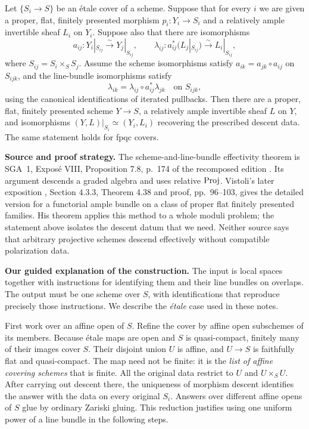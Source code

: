 \begin{Th}
\label{desc:polarized-theorem}
Let $\{S_i\to S\}$ be an \textup{\'etale} cover of a scheme.
Suppose that for every $i$ we are given a proper, flat, finitely
presented morphism $p_i:Y_i\to S_i$ and a relatively ample invertible
sheaf $L_i$ on $Y_i$. Suppose also that there are isomorphisms
\[
 a_{ij}:Y_i|_{S_{ij}}\xrightarrow{\sim}Y_j|_{S_{ij}},
 \qquad
 \lambda_{ij}:a_{ij}^*(L_j|_{S_{ij}})
                   \xrightarrow{\sim}L_i|_{S_{ij}},
\]
where $S_{ij}=S_i\times_S S_j$. Assume the scheme isomorphisms satisfy
$a_{ik}=a_{jk}\circ a_{ij}$ on $S_{ijk}$, and the line-bundle
isomorphisms satisfy
\begin{equation}\label{desc:bundle-cocycle}
 \lambda_{ik}=\lambda_{ij}\circ a_{ij}^*\lambda_{jk}
 \quad\text{on }S_{ijk},
\end{equation}
using the canonical identifications of iterated pullbacks.
Then there are a proper, flat, finitely presented scheme $Y\to S$, a
relatively ample invertible sheaf $L$ on $Y$, and isomorphisms
$(Y,L)|_{S_i}\simeq(Y_i,L_i)$ recovering the prescribed descent data.
The same statement holds for fpqc covers.
\end{Th}

\noindent\textbf{Source and proof strategy.}
The scheme-and-line-bundle effectivity theorem is SGA~1,
Expos\'e VIII, Proposition 7.8, p.~174 of the recomposed edition
\cite{SGA1}. Its argument descends a graded algebra and uses
relative $\operatorname{Proj}$. Vistoli's later exposition \cite{Vistoli},
Section 4.3.3, Theorem 4.38 and proof, pp.~96--103, gives the detailed
version for a functorial ample bundle on a class of proper flat
finitely presented families. His theorem applies this method to a
whole moduli problem; the statement above isolates the descent datum
that we need. Neither source says that arbitrary projective schemes
descend effectively without compatible polarization data.

\noindent\textbf{Our guided explanation of the construction.}
The input is local spaces together with instructions for identifying
them and their line bundles on overlaps. The output must be one
scheme over $S$, with identifications that reproduce precisely those
instructions. We describe the \emph{\'etale} case used in these notes.

First work over an affine open of $S$. Refine the cover by affine open
subschemes of its members. Because \'etale maps are open and $S$ is
quasi-compact, finitely many of their images cover $S$. Their disjoint
union $U$ is affine, and $U\to S$ is faithfully flat and
quasi-compact. The map need not be finite: it is the \emph{list of
affine covering schemes} that is finite. All the original data restrict
to $U$ and $U\times_S U$. After carrying out descent there, the
uniqueness of morphism descent identifies the answer with the data on
every original $S_i$. Answers over different affine opens of $S$ glue
by ordinary Zariski gluing. This reduction justifies using one uniform
power of a line bundle in the following steps.

